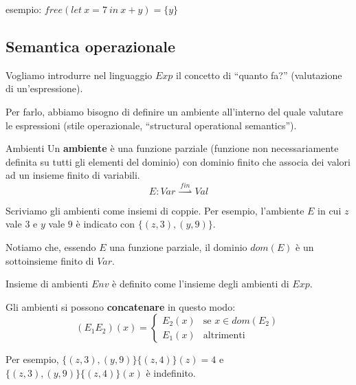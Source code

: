\documentclass[a4paper,11pt]{report}
\newcommand{\farrow}{\overset{fin}{\rightharpoonup}}
\begin{document}
esempio: \( free(let \ x = 7 \ in \ x+y) = \{y\}\)

\subsection{Semantica operazionale}

Vogliamo introdurre nel linguaggio \( Exp \) il concetto di ``quanto fa?'' (valutazione di un'espressione).

Per farlo, abbiamo bisogno di definire un ambiente all'interno del quale valutare le espressioni (stile operazionale, ``structural operational semantics'').

\begin{defframe}{Ambienti}{}
    Un \textbf{ambiente} è una funzione parziale (funzione non necessariamente definita su tutti gli elementi del dominio) con dominio finito che associa dei valori ad un insieme finito di variabili.
    \[ E : Var \ \farrow \ Val  \]

    Scriviamo gli ambienti come insiemi di coppie. Per esempio, l'ambiente \( E \) in cui \( z \) vale \( 3 \) e \( y \) vale \( 9 \) è indicato con \( \{(z, 3), (y, 9)\} \).

    Notiamo che, essendo \( E \) una funzione parziale, il dominio \( dom(E) \) è un sottoinsieme finito di \( Var \).

    \begin{defframe}[colframe=DarkOrchid, colbacktitle=DarkOrchid]{Insieme di ambienti}{}
        \( Env \) è definito come l'insieme degli ambienti di \( Exp \).

    \end{defframe}

\end{defframe}

\vspace{0.5em}

Gli ambienti si possono \textbf{concatenare} in questo modo:
\[ (E_1 E_2)(x) = \begin{cases}
    E_2(x) & \text{se } x\in dom(E_2) \\
    E_1(x) & \text{altrimenti}
\end{cases}
\]

Per esempio, \( \{(z, 3), (y, 9)\}\{(z, 4)\}(z) = 4 \) e \( \{(z, 3), (y, 9)\}\{(z, 4)\}(x) \) è indefinito.

\vspace{0.5em}
\end{document}
